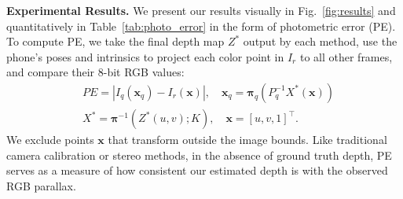 \begin{table}[h]
	\vspace{0.1em}
	\caption{\label{tab:photo_error}%
	Quantitative comparison for our eight tested scenes. Each entry shows: mean absolute error $/$ mean squared error. Note that different scenes can have different scales of error, as it is dependent on their overall image texture content.
	}
\end{table}

\vspace{0.5em}\noindent\textbf{Experimental Results.}\hspace{0.1em} We present our results visually in Fig.~\ref{fig:results} and quantitatively in Table~\ref{tab:photo_error} in the form of photometric error (PE). To compute PE, we take the final depth map $Z^*$ output by each method, use the phone's poses and intrinsics to project each color point in $I_r$ to all other frames, and compare their 8-bit RGB values:
\begin{align}\label{eq:photometric_error}
    &PE = |I_q(\bm{x}_q) - I_r(\bm{x})|, \quad \mathbf{x}_q=\bm{\pi}_q(P_q^{-1}X^{*}(\bm{x}))\nonumber\\
    &X^{*} = \bm{\pi}^{-1}(Z^*(u,v);K), \quad \bm{x}=[u,v,1]^\top.
\end{align}
We exclude points $\bm{x}$ that transform outside the image bounds. Like traditional camera calibration or stereo methods, in the absence of ground truth depth, PE serves as a measure of how consistent our estimated depth is with the observed RGB parallax.

